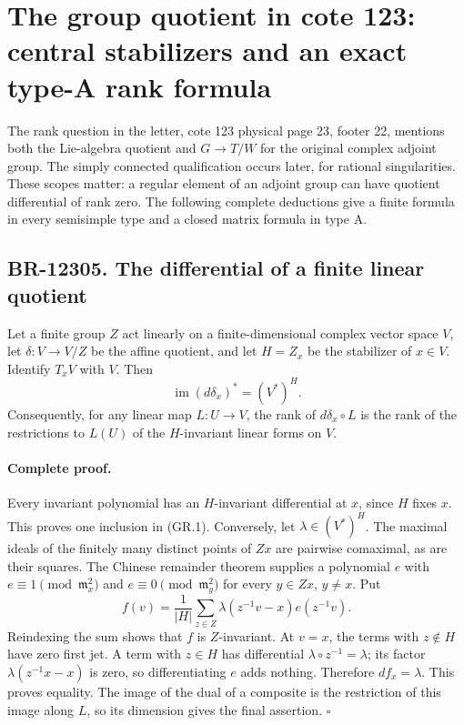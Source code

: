 \section{The group quotient in cote 123: central stabilizers and an exact type-A rank formula}

The rank question in the letter, cote 123 physical page 23, footer 22,
mentions both the Lie-algebra quotient and $G\to T/W$ for the original
complex adjoint group.  The simply connected qualification occurs later,
for rational singularities.  These scopes matter: a regular element of
an adjoint group can have quotient differential of rank zero.  The
following complete deductions give a finite formula in every semisimple
type and a closed matrix formula in type A.

\subsection{BR-12305. The differential of a finite linear quotient}
Let a finite group $Z$ act linearly on a finite-dimensional complex
vector space $V$, let $\delta:V\to V/Z$ be the affine quotient, and
let $H=Z_x$ be the stabilizer of $x\in V$.  Identify $T_xV$ with $V$.
Then
\[
 \operatorname{im}(d\delta_x)^*=(V^*)^H.
 \tag{GR.1}
\]
Consequently, for any linear map $L:U\to V$, the rank of
$d\delta_x\circ L$ is the rank of the restrictions to $L(U)$ of
the $H$-invariant linear forms on $V$.

\paragraph{Complete proof.}
Every invariant polynomial has an $H$-invariant differential at $x$,
since $H$ fixes $x$.  This proves one inclusion in (GR.1).
Conversely, let $\lambda\in(V^*)^H$.  The maximal ideals of the
finitely many distinct points of $Zx$ are pairwise comaximal, as are
their squares.  The Chinese remainder theorem supplies a polynomial
$e$ with $e\equiv1\pmod{\mathfrak m_x^2}$ and
$e\equiv0\pmod{\mathfrak m_y^2}$ for every $y\in Zx$, $y\ne x$.
Put
\[
 f(v)=\frac1{|H|}\sum_{z\in Z}
       \lambda(z^{-1}v-x)e(z^{-1}v).
\]
Reindexing the sum shows that $f$ is $Z$-invariant.  At $v=x$,
the terms with $z\notin H$ have zero first jet.  A term with
$z\in H$ has differential $\lambda\circ z^{-1}=\lambda$;
its factor $\lambda(z^{-1}x-x)$ is zero, so differentiating $e$
adds nothing.  Therefore $df_x=\lambda$.  This proves equality.
The image of the dual of a composite is the restriction of this
image along $L$, so its dimension gives the final assertion.
\(\square\)

